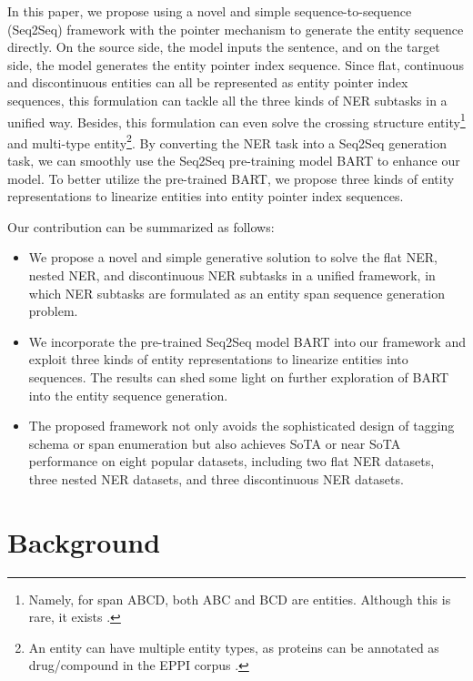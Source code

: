 \documentclass[11pt,a4paper]{article}
\begin{document}
In this paper, we propose using a novel and simple sequence-to-sequence (Seq2Seq) framework with the pointer mechanism  \citep{DBLP:conf/nips/VinyalsFJ15} to generate the entity sequence directly. On the source side, the model inputs the sentence, and on the target side, the model generates the entity pointer index sequence. Since flat, continuous and discontinuous entities can all be represented as entity pointer index sequences, this formulation can tackle all the three kinds of NER subtasks in a unified way. Besides, this formulation can even solve the crossing structure entity\footnote{Namely, for span ABCD, both ABC and BCD are entities. Although this is rare, it exists \citep{DBLP:conf/acl/DaiKHP20}.} and multi-type entity\footnote{An entity can have multiple entity types, as proteins can be annotated as drug/compound in the EPPI corpus \citep{DBLP:conf/bionlp/AlexHG07}.}. By converting the NER task into a Seq2Seq generation task, we can smoothly use the Seq2Seq pre-training model BART \citep{DBLP:conf/acl/LewisLGGMLSZ20} to enhance our model.
To better utilize the pre-trained BART, we propose three kinds of entity representations to linearize entities into entity pointer index sequences.

Our contribution can be summarized as follows:
\begin{itemize}
\setlength{\itemsep}{1pt}\setlength{\parskip}{1pt}\item We propose a novel and simple generative solution to solve the flat NER, nested NER, and discontinuous NER subtasks in a unified framework, in which NER subtasks are formulated as an entity span sequence generation problem.
  \item We incorporate the pre-trained Seq2Seq model BART into our framework and exploit three kinds of entity representations to linearize entities into sequences. The results can shed some light on further exploration of BART into the entity sequence generation.
  \item The proposed framework not only avoids the sophisticated design of tagging schema or span enumeration but also achieves SoTA or near SoTA performance on eight popular datasets, including two flat NER datasets, three nested NER datasets, and three discontinuous NER datasets.
\end{itemize}

\section{Background}
\end{document}
